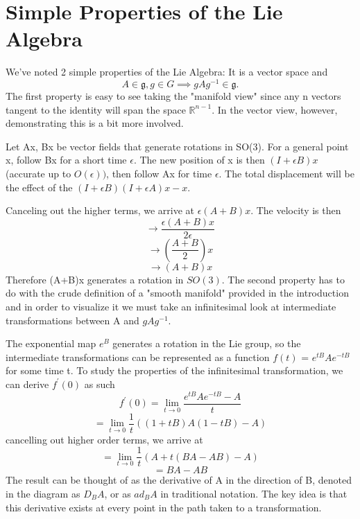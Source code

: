 \documentclass{article}
\begin{document}
\section{Simple Properties of the Lie Algebra}
We've noted 2 simple properties of the Lie Algebra: It is a vector space and\[ A \in \mathfrak{g},g \in G \implies gAg^{-1} \in \mathfrak{g}.\]
The first property is easy to see taking the "manifold view" since any n vectors tangent to the identity will span the space $\mathbb{R}^{n-1}$.
In the vector view, however, demonstrating this is a bit more involved.

Let Ax, Bx be vector fields that generate rotations in SO(3). For a general point x, follow Bx for a short time $\epsilon$. The new position of x is then $(I + \epsilon B)x$ (accurate up to $O(\epsilon))$, then follow Ax for time $\epsilon$. The total displacement will be the effect of the $(I + \epsilon B)(I + \epsilon A)x - x$.

Canceling out the higher terms, we arrive at $\epsilon(A+B)x$. The velocity is then 
\[\longrightarrow\frac{\epsilon(A+B)x}{2\epsilon} \]
\[\longrightarrow (\frac{A+B}{2})x\] 
\[\longrightarrow (A+B)x\] 
Therefore (A+B)x generates a rotation in $SO(3)$.
The second property has to do with the crude definition of a "smooth manifold" provided in the introduction and in order to visualize it we must take an infinitesimal look at intermediate transformations between A and $gAg^{-1}$.


The exponential map $e^{B}$ generates a rotation in the Lie group, so the intermediate transformations can be represented as a function $f(t)$ =  $e^{tB}Ae^{-tB}$ for some time t. To study the properties of the infinitesimal transformation, we can derive $f^{'}(0)$ as such
\[f^{'}(0) = \lim_{t\to 0}{\frac{e^{tB}Ae^{-tB}-A}{t}}\]
\[= \lim_{t\to 0}{\frac{1}{t}((1+tB)A(1-tB)-A)}\]
cancelling out higher order terms, we arrive at
\[= \lim_{t\to 0}{\frac{1}{t}(A+t(BA-AB)-A)}\]
\[= BA-AB\]
The result can be thought of as the derivative of A in the direction of B,  denoted in the diagram as $D_{B}A$, or as $ad_{B}A$ in traditional notation. The key idea is that this derivative exists at every point in the path taken to a transformation.
\end{document}
